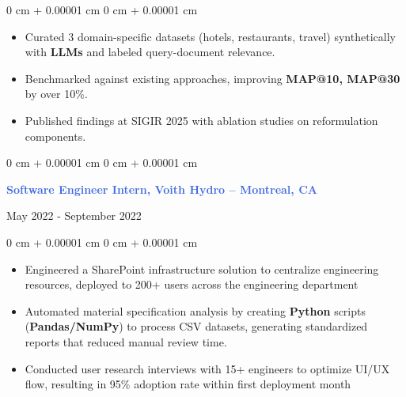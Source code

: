 \documentclass[10pt, letterpaper]{article}
\newenvironment{highlights}{
    \begin{itemize}[
        topsep=0.10 cm,
        parsep=0.10 cm,
        partopsep=0pt,
        itemsep=0pt,
        leftmargin=0 cm + 10pt
    ]
}{
    \end{itemize}
}
\newenvironment{onecolentry}{
    \begin{adjustwidth}{
        0 cm + 0.00001 cm
    }{
        0 cm + 0.00001 cm
    }
}{
    \end{adjustwidth}
}
\newenvironment{twocolentry}[2][]{
    \onecolentry
    \def\secondColumn{#2}
    \setcolumnwidth{\fill, 4.5 cm}
    \begin{paracol}{2}
}{
    \switchcolumn \raggedleft \secondColumn
    \end{paracol}
    \endonecolentry
}
\begin{document}
\begin{onecolentry}
\begin{highlights}
        \item Curated 3 domain-specific datasets (hotels, restaurants, travel) synthetically with \textbf{LLMs} and labeled query-document relevance.
        \item Benchmarked against existing approaches, improving \textbf{MAP@10, MAP@30} by over 10\%.
        \item Published findings at SIGIR 2025 with ablation studies on reformulation components.
    \end{highlights}
\end{onecolentry}

\vspace{0.25 cm}
\begin{twocolentry}{May 2022 - September 2022}
    \textcolor{royalblue}{\textbf{Software Engineer Intern, Voith Hydro -- Montreal, CA}}
\end{twocolentry}
\begin{onecolentry}
    \begin{highlights}
        \item Engineered a SharePoint infrastructure solution to centralize engineering resources, deployed to 200+ users across the engineering department
        \item Automated material specification analysis by creating \textbf{Python} scripts (\textbf{Pandas/NumPy}) to process CSV datasets, generating standardized reports that reduced manual review time.
        \item Conducted user research interviews with 15+ engineers to optimize UI/UX flow, resulting in 95\% adoption rate within first deployment month
    \end{highlights}
\end{onecolentry}
\end{document}
